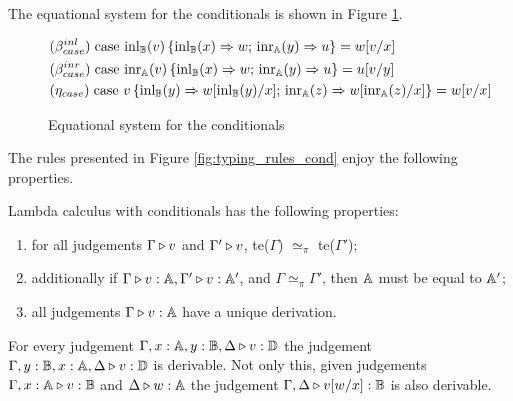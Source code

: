 \documentclass[a4paper,UKenglish,cleveref, autoref, thm-restate]{lipics-v2021}
\begin{document}
The equational system for the conditionals is shown in Figure
\ref{fig:equations-in-context-cond}.
  \begin{figure}[h!]
    \centering
    \begin{tcolorbox}[colframe=black, colback=white, boxrule=0.6pt, arc=1pt,boxsep=1pt,top=1pt,bottom=1pt, width=0.85 \textwidth]
    \begin{equation*}
        \begin{split}
          &(\beta_{case}^{inl}) \hspace{3pt} \text{case } 
          \mathrm{inl}_{\mathbb{B}}(v)\, \{ \mathrm{inl}_{\mathbb{B}} (x) \Rightarrow w 
          ;\, \mathrm{inr}_{\mathbb{A}} (y) 
          \Rightarrow u\}= w[v/x]
          \\
          &(\beta_{case}^{inr}) \hspace{3pt} \text{case } 
          \mathrm{inr}_{\mathbb{A}}(v)\, \{ \mathrm{inl}_{\mathbb{B}} (x) \Rightarrow w 
          ;\, \mathrm{inr}_{\mathbb{A}} (y) 
          \Rightarrow u\}= u[v/y]
          \\
          & (\eta_{case}) \hspace{3pt} \text{case } v\, \{\text{inl}_{\mathbb{B}} (y) \Rightarrow w [ \text{inl}_{\mathbb{B}}(y)/x] ;\, \text{inr}_{\mathbb{A}} (z) \Rightarrow w [ \text{inr}_{\mathbb{A}}(z)/x]\} = w[v/x] 
        \end{split}
    \end{equation*}
    \end{tcolorbox}
    \caption{Equational system for the conditionals}
    \label{fig:equations-in-context-cond}
    \end{figure}
The rules presented in Figure \ref{fig:typing_rules_cond} enjoy the following
properties.

\begin{theorem} \label {theorem:unique_der}
   Lambda calculus with conditionals has the following properties:
   \begin{enumerate}
     \item\label{perm} for all judgements $\Gamma \triangleright v$ and $\Gamma'
             \triangleright v$, te($\Gamma$) $\simeq_{\pi}$  te($\Gamma'$); 
     \item\label{type} additionally if $\Gamma \triangleright v: \mathbb{A},
       \Gamma' \triangleright v: \mathbb{A}'$, and $\Gamma \simeq_{\pi}
       \Gamma'$, then $\mathbb{A}$ must be equal to $\mathbb{A}'$;
     \item\label{der} all judgements $\Gamma \triangleright v:\mathbb{A}$ have a unique derivation.
\end{enumerate}
\end{theorem}
\begin{lemma}
\label{lem:exh_and_sub} 
For every judgement $\Gamma,x: \mathbb{A}, y: \mathbb{B}, \Delta \triangleright v: \mathbb{D}$ the
judgement $\Gamma, y:\mathbb{B}, x:\mathbb{A}, \Delta \triangleright v:
\mathbb{D}$ is derivable. Not only this, given judgements  $\Gamma,x:\mathbb{A} \triangleright
v: \mathbb{B}$ and $\Delta \triangleright w: \mathbb{A}$ the judgement $\Gamma, \Delta \triangleright
v[w/x]: \mathbb{B}$ is also derivable.
\end{lemma}
\end{document}
